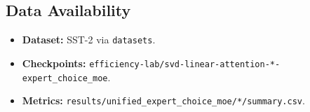 \subsection{Data Availability}

\begin{itemize}
\item \textbf{Dataset:} SST-2 via \texttt{datasets}.
\item \textbf{Checkpoints:} \texttt{efficiency-lab/svd-linear-attention-*-expert\_choice\_moe}.
\item \textbf{Metrics:} \texttt{results/unified\_expert\_choice\_moe/*/summary.csv}.

\end{itemize}

